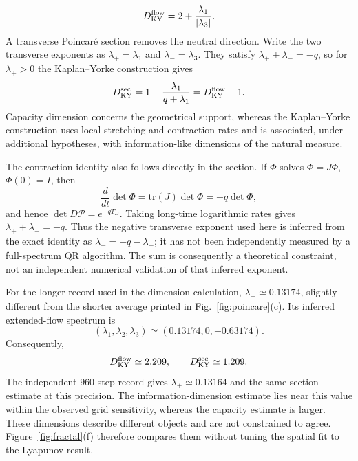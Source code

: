 \documentclass[aps,prb,reprint,floatfix]{revtex4-2}
\begin{document}
\begin{equation}
 D_{\rm KY}^{\rm flow}=2+\frac{\lambda_1}{|\lambda_3|}.
\label{eq:kaplanyorke_flow}
\end{equation}
A transverse Poincar\'e section removes the neutral direction. Write the two transverse exponents as $\lambda_+=\lambda_1$ and $\lambda_-=\lambda_3$. They satisfy $\lambda_++\lambda_-=-q$, so for $\lambda_+>0$ the Kaplan--Yorke construction gives
\begin{equation}
 D_{\rm KY}^{\rm sec}=1+\frac{\lambda_1}{q+\lambda_1}=D_{\rm KY}^{\rm flow}-1.
\label{eq:kaplanyorke_section}
\end{equation}
Capacity dimension concerns the geometrical support, whereas the Kaplan--Yorke construction uses local stretching and contraction rates and is associated, under additional hypotheses, with information-like dimensions of the natural measure.\cite{FarmerOttYorke1983,Ott2002}

The contraction identity also follows directly in the section. If $\Phi$ solves $\dot\Phi=J\Phi$, $\Phi(0)=I$, then
\begin{equation}
\frac{d}{dt}\det\Phi=\mathrm{tr}(J)\det\Phi=-q\det\Phi,
\end{equation}
and hence $\det D\mathcal P=e^{-qT_D}$. Taking long-time logarithmic rates gives $\lambda_++\lambda_-=-q$. Thus the negative transverse exponent used here is inferred from the exact identity as $\lambda_-=-q-\lambda_+$; it has not been independently measured by a full-spectrum QR algorithm. The sum is consequently a theoretical constraint, not an independent numerical validation of that inferred exponent.

For the longer record used in the dimension calculation, $\lambda_+\simeq0.13174$, slightly different from the shorter average printed in Fig.~\ref{fig:poincare}(c). Its inferred extended-flow spectrum is
\begin{equation}
(\lambda_1,\lambda_2,\lambda_3)\simeq(0.13174,0,-0.63174).
\end{equation}
Consequently,
\begin{equation}
D_{\rm KY}^{\rm flow}\simeq2.209,\qquad
D_{\rm KY}^{\rm sec}\simeq1.209.
\end{equation}
The independent $960$-step record gives $\lambda_+\simeq0.13164$ and the same section estimate at this precision. The information-dimension estimate lies near this value within the observed grid sensitivity, whereas the capacity estimate is larger. These dimensions describe different objects and are not constrained to agree. Figure~\ref{fig:fractal}(f) therefore compares them without tuning the spatial fit to the Lyapunov result.
\end{document}
